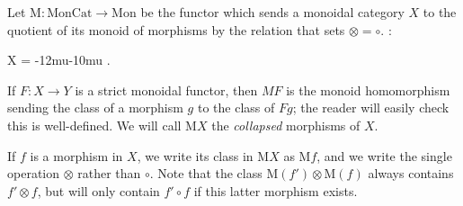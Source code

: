 \documentclass{amsbook} %
\newcommand{\bigquotient}[2]{ \raisebox{0.75\height}{$#1$} \mkern-12mu\scalebox{2}{$\diagup$}\mkern-10mu \raisebox{-0.5\height}{$#2$} }
\newenvironment{eq*}{\begin{equation*}}{\end{equation*}}
\numberwithin{section}{chapter}
\begin{document}
\begin{Defi} Let $\mathrm{M} : \mathrm{MonCat} \to \mathrm{Mon}$ be the functor which sends a monoidal category $X$ to the quotient of its monoid of morphisms by the relation that sets $\otimes = \circ$. :
\begin{eq*} X \quad = \quad \bigquotient{\mathrm{Mor}(X)}{f' \circ f \sim f' \otimes f}.\end{eq*}
If $F:X \to Y$ is a strict monoidal functor, then $MF$ is the monoid homomorphism sending the class of a morphism $g$ to the class of $Fg$; the reader will easily check this is well-defined. We will call $\mathrm{M}X$ the \emph{collapsed} morphisms of $X$.


\end{Defi}

\begin{nota}
If $f$ is a morphism in $X$, we write its class in $\mathrm{M}X$ as $\mathrm{M}f$, and we write the single operation $\otimes$ rather than $\circ$. Note that the class $\mathrm{M}(f') \otimes \mathrm{M}(f)$ always contains $f' \otimes f$, but will only contain $f' \circ f$ if this latter morphism exists.
\end{nota}
\end{document}
